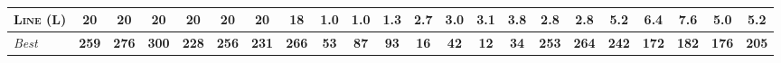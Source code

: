 \documentclass[11pt,landscape]{article}
\begin{document}
\begin{table*}[tb]
{\begin{tabular}{|l||ccccccc||ccccccc||ccccccc||}
\textsc{Line} (L)&\textbf{20}&\textbf{20}&\textbf{20}&\textbf{20}&\textbf{20}&\textbf{20}&18&\textbf{1.0}&\textbf{1.0}&1.3&2.7&3.0&3.1&3.8&\textbf{2.8}&\textbf{2.8}&5.2&6.4&7.6&5.0&5.2
\\\hline
\textit{Best}&\textbf{259}&\textbf{276}&\textbf{300}&\textbf{228}&\textbf{256}&\textbf{231}&\textbf{266}&\textbf{53}&\textbf{87}&\textbf{93}&\textbf{16}&\textbf{42}&\textbf{12}&\textbf{34}&\textbf{253}&\textbf{264}&\textbf{242}&\textbf{172}&\textbf{182}&\textbf{176}&\textbf{205}\\\hline

        \end{tabular}}
        \caption{}
        \label{tab:all-patty}
        \end{table*}
        
\end{document}
